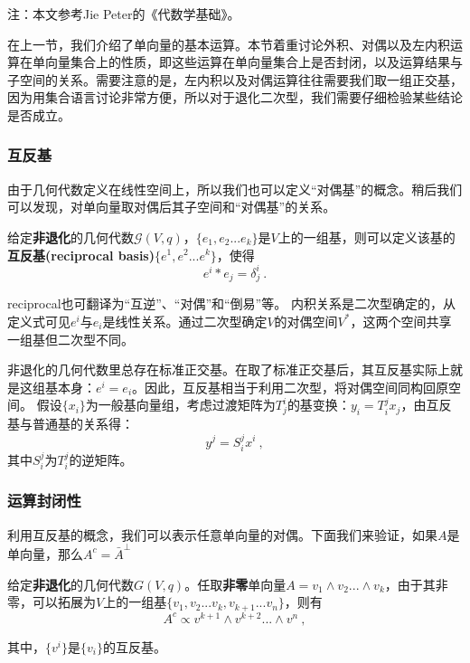 

\begin{issues}
\issueTODO
\end{issues}
注：本文参考Jie Peter的《代数学基础》。

在上一节，我们介绍了单向量的基本运算。本节着重讨论外积、对偶以及左内积运算在单向量集合上的性质，即这些运算在单向量集合上是否封闭，以及运算结果与子空间的关系。需要注意的是，左内积以及对偶运算往往需要我们取一组正交基，因为用集合语言讨论非常方便，所以对于退化二次型，我们需要仔细检验某些结论是否成立。
\subsubsection{互反基}
由于几何代数定义在线性空间上，所以我们也可以定义“对偶基”的概念。稍后我们可以发现，对单向量取对偶后其子空间和“对偶基”的关系。

\begin{definition}{}
给定\textbf{非退化}的几何代数$\mathcal G(V,q)$，$\{e_1,e_2...e_k\}$是$V$上的一组基，则可以定义该基的\textbf{互反基(reciprocal basis)}$\{e^1,e^2...e^k\}$，使得
\begin{equation}
e^i*e_j=\delta^i_j~.
\end{equation}
\end{definition}
reciprocal也可翻译为“互逆”、“对偶”和“倒易”等。
内积关系是二次型确定的，从定义式可见$e^i$与$e_i$是线性关系。通过二次型确定$V$的对偶空间$V^*$，这两个空间共享一组基但二次型不同。

非退化的几何代数里总存在标准正交基。在取了标准正交基后，其互反基实际上就是这组基本身：$e^i=e_i$。因此，互反基相当于利用二次型，将对偶空间同构回原空间。
假设$\{x_i\}$为一般基向量组，考虑过渡矩阵为$T^i_j$的基变换：$y_i=T^j_ix_j$，由互反基与普通基的关系得：
\begin{equation}
y^j=S^j_ix^i~,
\end{equation}
其中$S^j_i$为$T^j_i$的逆矩阵。

\subsubsection{运算封闭性}
利用互反基的概念，我们可以表示任意单向量的对偶。下面我们来验证，如果$A$是单向量，那么$A^c=\bar A^{\perp}$
\begin{theorem}{}\label{the_Clf05_1}
给定\textbf{非退化}的几何代数$G(V,q)$。任取\textbf{非零}单向量$A=v_1\wedge v_2...\wedge v_k$，由于其非零，可以拓展为$V$上的一组基$\{v_1,v_2...v_k,v_{k+1}...v_n\}$，则有
\begin{equation}
A^c\propto v^{k+1}\wedge v^{k+2}...\wedge v^n~,
\end{equation}
\end{theorem}
其中，$\{v^i\}$是$\{v_i\}$的互反基。

